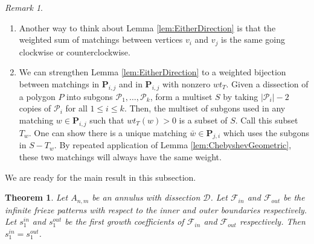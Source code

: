 \documentclass[12pt]{article}
\newtheorem{theorem}{Theorem}
\theoremstyle{remark}
\newtheorem{remark}{Remark}
\newcommand*{\pathset}[2]{\mathbf{P}_{#1,#2}}
\newcommand*{\poly}[1]{\mathcal{P}_{#1}}
\newcommand*{\D}{\mathcal{D}}
\begin{document}
\begin{remark}
\begin{enumerate}
    \item Another way to think about Lemma \ref{lem:EitherDirection} is that the weighted sum of matchings between vertices $v_i$ and $v_j$ is the same going clockwise or counterclockwise.
    \item We can strengthen Lemma \ref{lem:EitherDirection} to a weighted bijection between matchings in $\pathset{i}{j}$ and in $\pathset{i}{j}$ with nonzero $wt_T$. Given a dissection of a polygon $P$ into subgons $\poly{1},\ldots,\poly{k}$, form a multiset $S$ by taking $\vert \poly{i}\vert - 2$ copies of $\poly{i}$ for all $1 \leq i \leq k$. Then, the multiset of subgons used in any matching $w \in \pathset{i}{j}$ such that $wt_T(w) > 0$ is a subset of $S$. Call this subset $T_w$. One can show there is a unique matching $\bar{w} \in \pathset{j}{i}$ which uses the subgons in $S - T_w$. By repeated application of Lemma \ref{lem:ChebyshevGeometric}, these two matchings will always have the same weight. 
\end{enumerate}
\end{remark}

We are ready for the main result in this subsection.

\begin{theorem}\label{theorem:EqualGrCo}
Let $A_{n,m}$ be an annulus with dissection $\D$. Let $\mathcal{F}_{in}$ and $\mathcal{F}_{out}$ be the infinite frieze patterns with respect to the inner and outer boundaries respectively. Let $s_1^{in}$ and $s_1^{out}$ be the first growth coefficients of  $\mathcal{F}_{in}$ and $\mathcal{F}_{out}$ respectively. Then $s_1^{in}= s_1^{out}$.
\end{theorem}
\end{document}
